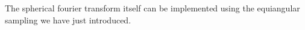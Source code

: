 \documentclass[book.tex]{subfiles}
\begin{document}
The spherical fourier transform itself can be implemented using the equiangular sampling we have just introduced.



\end{document}
